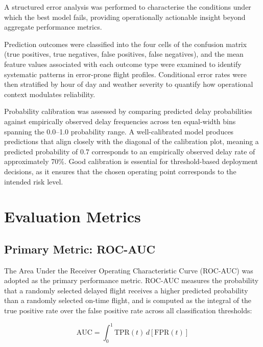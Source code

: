 \documentclass{report}
\begin{document}
A structured error analysis was performed to characterise the conditions
under which the best model fails, providing operationally actionable insight
beyond aggregate performance metrics.

Prediction outcomes were classified into the four cells of the confusion
matrix (true positives, true negatives, false positives, false negatives),
and the mean feature values associated with each outcome type were examined
to identify systematic patterns in error-prone flight profiles.  Conditional
error rates were then stratified by hour of day and weather severity to
quantify how operational context modulates reliability.

Probability calibration was assessed by comparing predicted delay
probabilities against empirically observed delay frequencies across
ten equal-width bins spanning the 0.0--1.0 probability range.  A
well-calibrated model produces predictions that align closely with the
diagonal of the calibration plot, meaning a predicted probability of 0.7
corresponds to an empirically observed delay rate of approximately 70\%.
Good calibration is essential for threshold-based deployment decisions, as
it ensures that the chosen operating point corresponds to the intended
risk level.


\section{Evaluation Metrics}
\label{sec:metrics}

\subsection{Primary Metric: ROC-AUC}

The Area Under the Receiver Operating Characteristic Curve (ROC-AUC) was
adopted as the primary performance metric.  ROC-AUC measures the probability
that a randomly selected delayed flight receives a higher predicted
probability than a randomly selected on-time flight, and is computed as the
integral of the true positive rate over the false positive rate across all
classification thresholds:

\begin{equation}
\text{AUC} = \int_0^1 \text{TPR}(t)\, d[\text{FPR}(t)]
\label{eq:auc}
\end{equation}
\end{document}
